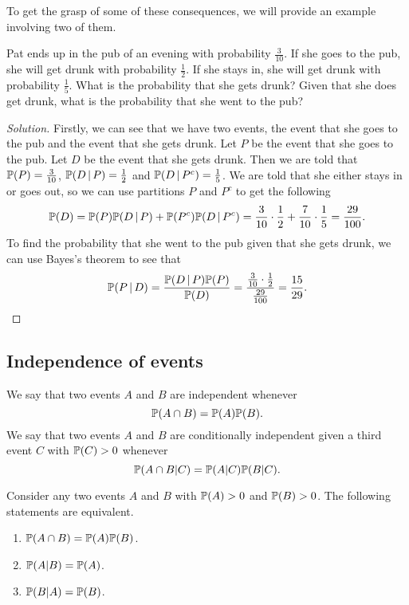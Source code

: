 \documentclass[10pt, a4paper]{article}
\begin{document}
To get the grasp of some of these consequences,
we will provide an example involving two of them.
\begin{example}
    Pat ends up in the pub of an evening with probability $\frac{3}{10}$.
    If she goes to the pub,
    she will get drunk with probability $\frac{1}{2}$.
    If she stays in,
    she will get drunk with probability $\frac{1}{5}$.
    What is the probability that she gets drunk?
    Given that she does get drunk,
    what is the probability that she went to the pub?
    \begin{proof}[Solution]\renewcommand{\qedsymbol}{}
        Firstly,
        we can see that we have two events,
        the event that she goes to the pub and the event that she gets drunk.
        Let $P$ be the event that she goes to the pub.
        Let $D$ be the event that she gets drunk.
        Then we are told that $\P(P) = \frac{3}{10}$, $\P(D\,|\,P) = \frac{1}{2}$ and $\P(D\,|\,P ^ c) = \frac{1}{5}$.
        We are told that she either stays in or goes out,
        so we can use partitions $P$ and $P ^ c$ to get the following
        \[
        \P(D) = \P(P)\P(D\,|\,P) + \P(P ^ c)\P(D\,|\,P ^ c) = \frac{3}{10}\cdot\frac{1}{2} + \frac{7}{10}\cdot\frac{1}{5} = \frac{29}{100}.
        \]
        To find the probability that she went to the pub given that she gets drunk,
        we can use Bayes's theorem to see that
        \[
        \P(P\,|\,D) = \frac{\P(D\,|\,P)\P(P)}{\P(D)} = \frac{\frac{3}{10}\cdot\frac{1}{2}}{\frac{29}{100}} = \frac{15}{29}.
        \]
        
    \end{proof}
\end{example}


\subsection{Independence of events}

\begin{definition}
    We say that two events $A$ and $B$ are independent whenever
    \[
    \P(A \cap B) = \P(A)\P(B).
    \]
    We say that two events $A$ and $B$ are conditionally independent given a third event $C$ with $\P(C) > 0$ whenever
    \[
    \P(A \cap B | C) = \P(A | C)\P(B | C).
    \]
\end{definition}

\begin{theorem}
    Consider any two events $A$ and $B$ with $\P(A) > 0$ and $\P(B) > 0$. The following statements are equivalent.
    \begin{enumerate}[label = (\roman*)]
        \item $\P(A \cap B) = \P(A)\P(B)$.
        \item $\P(A | B) = \P(A)$.
        \item $\P(B | A) = \P(B)$.
    \end{enumerate}
\end{theorem}
\end{document}
